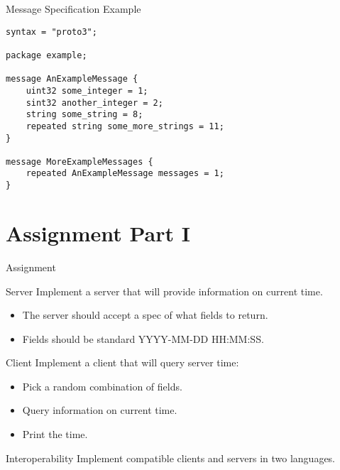 

\begin{frame}[fragile]{Message Specification Example}
\begin{lstlisting}[style=mini]
syntax = "proto3";

package example;

message AnExampleMessage {
    uint32 some_integer = 1;
    sint32 another_integer = 2;
    string some_string = 8;
    repeated string some_more_strings = 11;
}

message MoreExampleMessages {
    repeated AnExampleMessage messages = 1;
}
\end{lstlisting}
\end{frame}




\section{Assignment Part I}


\begin{frame}{Assignment}
    \begin{block}{Server}
        Implement a server that will provide information on current time.
        \begin{itemize}
            \item The server should accept a spec of what fields to return.
            \item Fields should be standard YYYY-MM-DD HH:MM:SS.
        \end{itemize}
    \end{block}

    \begin{block}{Client}
        Implement a client that will query server time:
        \begin{itemize}
            \item Pick a random combination of fields.
            \item Query information on current time.
            \item Print the time.
        \end{itemize}
    \end{block}

    \begin{block}{Interoperability}
        Implement compatible clients and servers in two languages.
    \end{block}
\end{frame}


